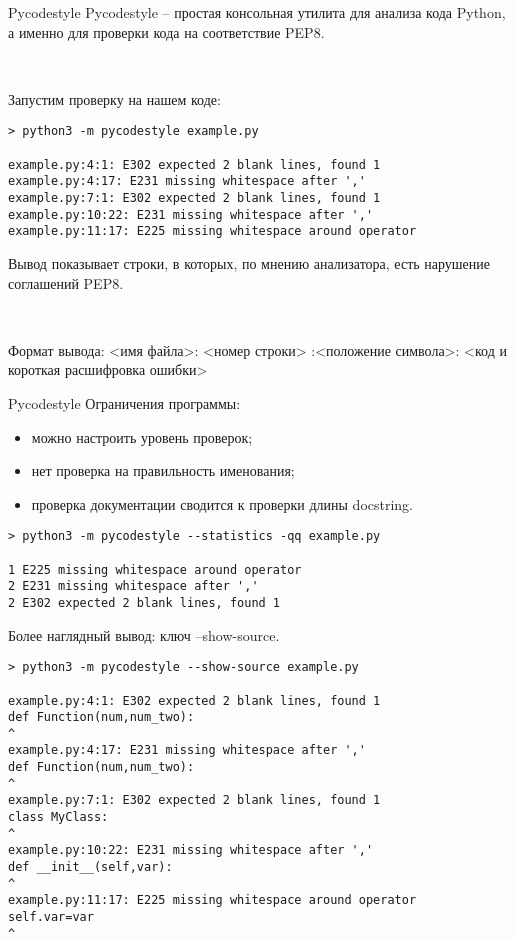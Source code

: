 \documentclass[xcolor=table]{beamer}
\begin{document}
\begin{frame}[fragile]{Pycodestyle}
	Pycodestyle -- простая консольная утилита для анализа кода Python, а именно для проверки кода на соответствие PEP8.

	~
		
	Запустим проверку на нашем коде:
	\begin{verbatim}
> python3 -m pycodestyle example.py 

example.py:4:1: E302 expected 2 blank lines, found 1
example.py:4:17: E231 missing whitespace after ','
example.py:7:1: E302 expected 2 blank lines, found 1
example.py:10:22: E231 missing whitespace after ','
example.py:11:17: E225 missing whitespace around operator
	\end{verbatim}
	 Вывод показывает строки, в которых, по мнению анализатора, есть нарушение соглашений PEP8. 

	~	 
	
	 Формат вывода:
<имя файла>: <номер строки> :<положение символа>: <код и короткая расшифровка ошибки>
\end{frame}

\begin{frame}[fragile]{Pycodestyle}
	Ограничения программы:
	\begin{itemize}
		\item можно настроить уровень проверок; 
		\item нет проверка на правильность именования; 
		\item проверка документации сводится к проверки длины docstring.
	\end{itemize}		
	\begin{verbatim}
> python3 -m pycodestyle --statistics -qq example.py 

1 E225 missing whitespace around operator
2 E231 missing whitespace after ','
2 E302 expected 2 blank lines, found 1	
	\end{verbatim}
\end{frame}

\begin{frame}[fragile]
	Более наглядный вывод: ключ --show-source. 
	\begin{verbatim}
> python3 -m pycodestyle --show-source example.py 

example.py:4:1: E302 expected 2 blank lines, found 1
def Function(num,num_two):
^
example.py:4:17: E231 missing whitespace after ','
def Function(num,num_two):
^
example.py:7:1: E302 expected 2 blank lines, found 1
class MyClass:
^
example.py:10:22: E231 missing whitespace after ','
def __init__(self,var):
^
example.py:11:17: E225 missing whitespace around operator
self.var=var
^
	\end{verbatim}
\end{frame}
\end{document}
